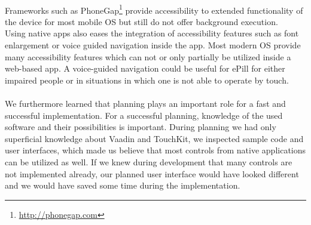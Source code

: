 \\
Frameworks such as PhoneGap\footnote{\url{http://phonegap.com}} provide accessibility to extended functionality of the device for most mobile OS but still do not offer background execution.
\\
Using native apps also eases the integration of accessibility features such as font enlargement or voice guided navigation inside the app. Most modern OS provide many accessibility features which can not or only partially be utilized inside a web-based app. A voice-guided navigation could be useful for ePill for either impaired people or in situations in which one is not able to operate by touch.
\\
\\
We furthermore learned that planning plays an important role for a fast and successful implementation. For a successful planning, knowledge of the used software and their possibilities is important. During planning we had only superficial knowledge about Vaadin and TouchKit, we inspected sample code and user interfaces, which made us believe that most controls from native applications can be utilized as well. If we knew during development that many controls are not implemented already, our planned user interface would have looked different and we would have saved some time during the implementation.